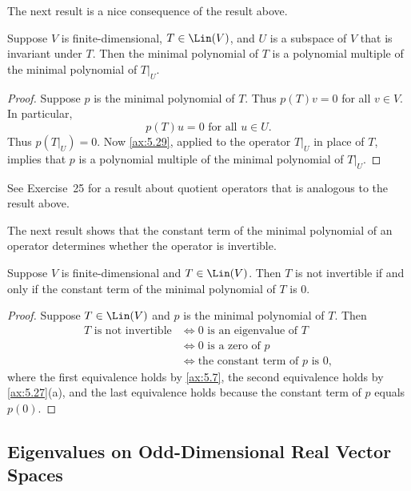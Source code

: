 The next result is a nice consequence of the result above.

\begin{result}\label{ax:5.31}
Suppose $V$ is finite-dimensional, $T\in\Lin(V)$, and $U$ is a subspace of
$V$ that is invariant under $T$. Then the minimal polynomial of $T$ is a
polynomial multiple of the minimal polynomial of $T|_U$.
\end{result}

\begin{proof}
Suppose $p$ is the minimal polynomial of $T$. Thus $p(T)v=0$ for all $v\in V$.
In particular,
\[ p(T)u=0 \text{ for all } u\in U. \]
Thus $p(T|_U)=0$. Now \ref{ax:5.29}, applied to the operator $T|_U$ in place
of $T$, implies that $p$ is a polynomial multiple of the minimal polynomial of
$T|_U$.
\end{proof}

See Exercise~25 for a result about quotient operators that is analogous to the
result above.

The next result shows that the constant term of the minimal polynomial of an
operator determines whether the operator is invertible.

\begin{result}\label{ax:5.32}
Suppose $V$ is finite-dimensional and $T\in\Lin(V)$. Then $T$ is not
invertible if and only if the constant term of the minimal polynomial of $T$
is $0$.
\end{result}

\begin{proof}
Suppose $T\in\Lin(V)$ and $p$ is the minimal polynomial of $T$. Then
\begin{align*}
T \text{ is not invertible}
  &\iff 0 \text{ is an eigenvalue of } T\\
  &\iff 0 \text{ is a zero of } p\\
  &\iff \text{the constant term of } p \text{ is } 0,
\end{align*}
where the first equivalence holds by \ref{ax:5.7}, the second equivalence
holds by \ref{ax:5.27}(a), and the last equivalence holds because the constant
term of $p$ equals $p(0)$.
\end{proof}

\subsection{Eigenvalues on Odd-Dimensional Real Vector Spaces}

